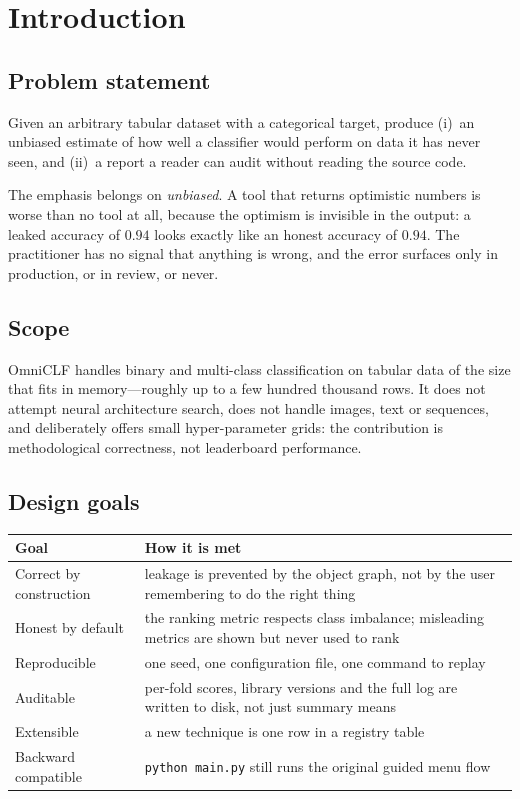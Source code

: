 \documentclass[11pt,a4paper]{article}
\begin{document}
\tableofcontents
\newpage

\section{Introduction}

\subsection{Problem statement}

Given an arbitrary tabular dataset with a categorical target, produce (i)~an
unbiased estimate of how well a classifier would perform on data it has never
seen, and (ii)~a report a reader can audit without reading the source code.

The emphasis belongs on \emph{unbiased}. A tool that returns optimistic numbers
is worse than no tool at all, because the optimism is invisible in the output:
a leaked accuracy of $0.94$ looks exactly like an honest accuracy of $0.94$.
The practitioner has no signal that anything is wrong, and the error surfaces
only in production, or in review, or never.

\subsection{Scope}

OmniCLF handles binary and multi-class classification on tabular data of the
size that fits in memory---roughly up to a few hundred thousand rows. It does
not attempt neural architecture search, does not handle images, text or
sequences, and deliberately offers small hyper-parameter grids: the
contribution is methodological correctness, not leaderboard performance.

\subsection{Design goals}

\begin{center}
\begin{tabularx}{\textwidth}{L{4.1cm} X}
\toprule
\textbf{Goal} & \textbf{How it is met} \\
\midrule
Correct by construction & leakage is prevented by the object graph, not by the user remembering to do the right thing \\
Honest by default & the ranking metric respects class imbalance; misleading metrics are shown but never used to rank \\
Reproducible & one seed, one configuration file, one command to replay \\
Auditable & per-fold scores, library versions and the full log are written to disk, not just summary means \\
Extensible & a new technique is one row in a registry table \\
Backward compatible & \texttt{python main.py} still runs the original guided menu flow \\
\bottomrule
\end{tabularx}
\end{center}
\end{document}
